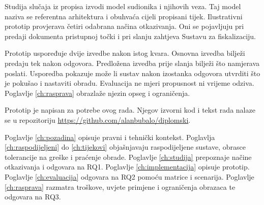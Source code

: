 Studija slučaja iz propisa izvodi model sudionika i njihovih veza. Taj model
naziva se referentna arhitektura i obuhvaća cijeli propisani tijek.
Ilustrativni prototip provjerava četiri odabrana načina otkazivanja. Oni se
pojavljuju pri predaji dokumenta pristupnoj točki i pri slanju zahtjeva
Sustavu za fiskalizaciju.

Prototip uspoređuje dvije izvedbe nakon istog kvara. Osnovna izvedba bilježi
predaju tek nakon odgovora. Predložena izvedba prije slanja bilježi što
namjerava poslati. Usporedba pokazuje može li sustav nakon izostanka odgovora
utvrditi što je pokušao i nastaviti obradu. Evaluacija ne mjeri propusnost ni
vrijeme odziva. Poglavlje \ref{ch:rasprava} obrazlaže njezin opseg i
ograničenja.

Prototip je napisan za potrebe ovog rada. Njegov izvorni kod i tekst rada
nalaze se u repozitoriju \url{https://github.com/alanbubalo/diplomski}.

Poglavlje \ref{ch:pozadina} opisuje pravni i tehnički kontekst. Poglavlja
\ref{ch:raspodijeljeni} do \ref{ch:tijekovi} objašnjavaju raspodijeljene
sustave, obrasce tolerancije na greške i praćenje obrade. Poglavlje
\ref{ch:studija} prepoznaje načine otkazivanja i odgovara na RQ1. Poglavlje
\ref{ch:implementacija} opisuje prototip. Poglavlje \ref{ch:evaluacija}
odgovara na RQ2 pomoću matrice i scenarija. Poglavlje \ref{ch:rasprava}
razmatra troškove, uvjete primjene i ograničenja obrazaca te odgovara na RQ3.
